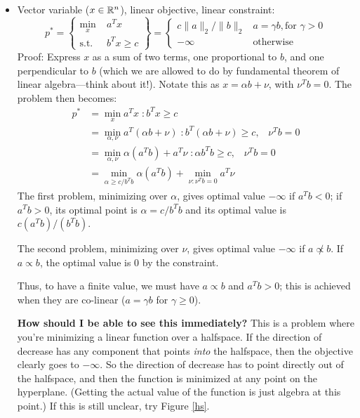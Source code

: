 \documentclass[12pt]{article}
\begin{document}
\begin{itemize}
\item Vector variable ($x \in { {\mathbb R}^{n} }$), linear objective, linear constraint:
%
\begin{equation*}
p^* = \left\{
\begin{aligned}
\min_{x} \; &a^T x \\
\text{s.t. } \;  &b^T x \geq c 
\end{aligned}
\right\}
= \left\{ \begin{array}{ll}
c \|a\|_2 / \|b\|_2 & a = \gamma b, \text{for } \gamma > 0 \\
-\infty & \text{otherwise}
\end{array}\right.
\end{equation*}
%
Proof: Express $x$ as a sum of two terms, one proportional to $b$, and one perpendicular to $b$ (which we are allowed to do by fundamental theorem of linear algebra---think about it!). Notate this as $x = \alpha b + \nu$, with $\nu^T b = 0$. The problem then becomes:
%
\begin{align*}
p^* &= \min_x a^T x \; : b^T x \geq c \\
&= \min_{\alpha, \nu} a^T (\alpha b + \nu) \; : b^T (\alpha b + \nu) \geq c, \;\;\; \nu^T b = 0  \\
&= \min_{\alpha, \nu} \alpha (a^T b)  + a^T \nu \; : \alpha b^T b \geq c, \;\;\; \nu^T b = 0  \\
&= \min_{\alpha \geq c/ b^T b} \alpha (a^T b) + \min_{\nu : \nu^T b = 0} a^T \nu 
\end{align*}
%
The first problem, minimizing over $\alpha$, gives optimal value $-\infty$ if $a^T b < 0$; if $a^T b > 0$, its optimal point is $\alpha = c / b^T b$ and its optimal value is $c (a^T b) / (b^T b)$.  

The second problem, minimizing over $\nu$, gives optimal value $-\infty$ if $a \not\propto b$. If $a \propto b$, the optimal value is $0$ by the constraint. 

Thus, to have a finite value, we must have $a \propto b$ and $a^T b > 0$; this is achieved when they are co-linear ($a = \gamma b$ for $\gamma \geq 0$). 

\textbf{How should I be able to see this immediately?} This is a problem where you're minimizing a linear function over a halfspace. If the direction of decrease has any component that points \textit{into} the halfspace, then the objective clearly goes to $-\infty$. So the direction of decrease has to point directly out of the halfspace, and then the function is minimized at any point on the hyperplane. (Getting the actual value of the function is just algebra at this point.) If this is still unclear, try Figure \ref{hs}. 


\end{itemize}
\end{document}
